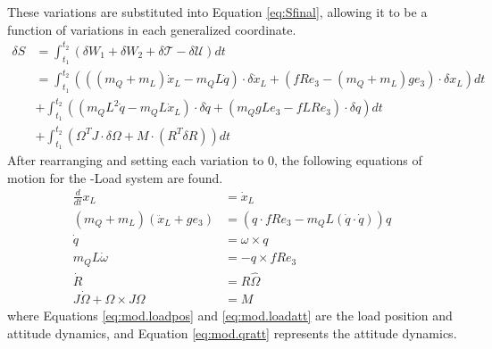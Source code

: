 
These variations are substituted into Equation \ref{eq:Sfinal}, allowing it to be a function of variations in each generalized coordinate.
\begin{equation}\label{eq:Sfinalfilled}
\begin{aligned}
\delta S &= \int_{t_1}^{t_2}(\delta W_1+\delta W_2+\delta\mathcal{T}-\delta\mathcal{U})dt\\
&=\int_{t_1}^{t_2}(((m_Q+m_L)\dot{x}_L-m_QL\dot{q})\cdot\delta\dot{x}_L+(fRe_3-(m_Q+m_L)ge_3)\cdot\delta x_L)dt\\
&+\int_{t_1}^{t_2}((m_QL^2\dot{q}-m_QL\dot{x}_L)\cdot\delta\dot{q}+(m_QgLe_3-fLRe_3)\cdot\delta q)dt\\
&+\int_{t_1}^{t_2}(\Omega^TJ \cdot \delta\Omega+M\cdot(R^T\delta R))dt
\end{aligned}
\end{equation}
After rearranging and setting each variation to 0, the following equations of motion for the -Load system are found. 
\begin{align}
\frac{d}{dt} x_L &=\dot{x}_L\\
(m_Q+m_L)(\ddot{x}_L+ge_3)&=(q\cdot fRe_3-m_QL(\dot{q}\cdot\dot{q}))q\label{eq:mod.loadpos}\\
\dot{q}&=\omega\times q\\
m_QL\dot{\omega}&=-q\times fRe_3\label{eq:mod.loadatt}\\
\dot{R}&=R\hat{\Omega} \label{eq:mod.R}\\ 
J\dot{\Omega}+\Omega\times J\Omega&= M \label{eq:mod.qratt}
\end{align}
where Equations \ref{eq:mod.loadpos} and \ref{eq:mod.loadatt} are the load position and attitude dynamics, and Equation \ref{eq:mod.qratt} represents the  attitude dynamics.

